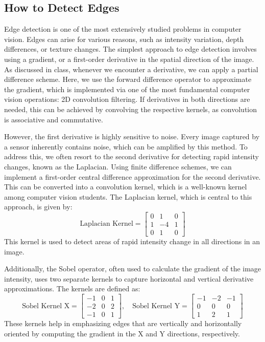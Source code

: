 \documentclass{article}
\begin{document}
\subsection*{How to Detect Edges}
Edge detection is one of the most extensively studied problems in computer vision. Edges can arise for various reasons, such as intensity variation, depth differences, or texture changes. The simplest approach to edge detection involves using a gradient, or a first-order derivative in the spatial direction of the image. As discussed in class, whenever we encounter a derivative, we can apply a partial difference scheme. Here, we use the forward difference operator to approximate the gradient, which is implemented via one of the most fundamental computer vision operations: 2D convolution filtering. If derivatives in both directions are needed, this can be achieved by convolving the respective kernels, as convolution is associative and commutative.

However, the first derivative is highly sensitive to noise. Every image captured by a sensor inherently contains noise, which can be amplified by this method. To address this, we often resort to the second derivative for detecting rapid intensity changes, known as the Laplacian. Using finite difference schemes, we can implement a first-order central difference approximation for the second derivative. This can be converted into a convolution kernel, which is a well-known kernel among computer vision students. The Laplacian kernel, which is central to this approach, is given by:
\[
\text{Laplacian Kernel} = \begin{bmatrix}
	0 & 1 & 0 \\
	1 & -4 & 1 \\
	0 & 1 & 0
\end{bmatrix}
\]
This kernel is used to detect areas of rapid intensity change in all directions in an image. 

Additionally, the Sobel operator, often used to calculate the gradient of the image intensity, uses two separate kernels to capture horizontal and vertical derivative approximations. The kernels are defined as:
\[
\text{Sobel Kernel X} = \begin{bmatrix}
	-1 & 0 & 1 \\
	-2 & 0 & 2 \\
	-1 & 0 & 1
\end{bmatrix},
\quad
\text{Sobel Kernel Y} = \begin{bmatrix}
	-1 & -2 & -1 \\
	0 & 0 & 0 \\
	1 & 2 & 1
\end{bmatrix}
\]
These kernels help in emphasizing edges that are vertically and horizontally oriented by computing the gradient in the X and Y directions, respectively.
\end{document}
